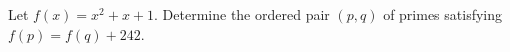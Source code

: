 Let $f(x) = x^2 + x + 1$. Determine the ordered pair $(p,q)$ of primes satisfying $f(p) = f(q) + 242$.